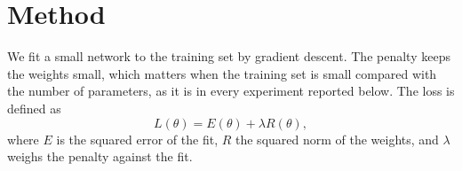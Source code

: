 \section{Method}
We fit a small network to the training set by gradient descent.
The penalty keeps the weights small, which matters when the
training set is small compared with the number of parameters,
as it is in every experiment reported below.
The loss is defined as
\begin{equation}
  L(\theta) = E(\theta)
  + \lambda R(\theta) ,
  \label{eq:loss}
\end{equation}
where $E$ is the squared error of the fit, $R$ the squared norm of the
weights, and $\lambda$ weighs the penalty against the fit.
